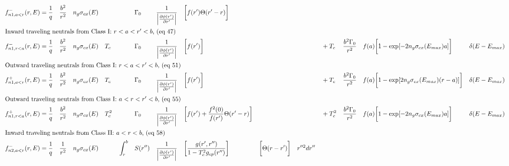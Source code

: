 \documentclass[a3]{book}
\begin{document}
{\begin{align}
&	f_{n1,a<r}^-(r, E) 	= \frac{1}{q}  	&& \frac{b^2}{ r^2 } 	&& n_g \sigma_{cx}(E) 	&&       		&& 			&& \Gamma_0 	&& \frac{1}{ \Big\vert \frac{  \partial \phi(r') }{ \partial r' } \Big\vert}	&& \bigg[ f(r') \Theta(r' - r) \bigg]   \\
	\intertext{Inward traveling neutrals from Class I: $r < a < r' < b$, (eq 47)} 																																																																														
&	f_{n1,r<a}^-(r, E)  	= \frac{1}{q} 	&& \frac{b^2}{ r^2 } 	&& n_g \sigma_{cx}(E) 	&& T_c 		&& 		 	&& \Gamma_0	&& \frac{1}{ \Big\vert \frac{  \partial \phi(r') }{ \partial r' } \Big\vert} 	&& \bigg[ f(r') \bigg] 											&& 																			&& 			&& + T_c	&& \frac{b^2 \Gamma_0}{r^2}   												&& f(a) \bigg[ 1 - \text{exp}[-2n_g\sigma_{cx}(E_{max})a] \bigg] 		&& \delta(E-E_{max})  		\\
%																																																																														
	\intertext{Outward traveling neutrals from Class I: $ r < a < r' < b$, (eq 51)}																																																																												
&	f_{n1,a<r}^+(r, E) 	= \frac{1}{q} 	&& \frac{b^2}{ r^2 }	&& n_g \sigma_{cx}(E) 	&& T_c 		&& 		 	&& \Gamma_0	&& \frac{1}{ \Big\vert \frac{  \partial \phi(r') }{ \partial r' } \Big\vert}	&& \bigg[ f(r')  \bigg]  											&& 																			&& 			&& + T_c	&& \frac{b^2 \Gamma_0}{r^2}  												&& f(a) \bigg[ 1 - \text{exp}[2 n_g\sigma_{cx}(E_{max})(r-a)] \bigg] 	&& \delta(E-E_{max})   	\\
	\intertext{Outward traveling neutrals from Class I: $a < r < r' < b$, (eq 55)}																																																																														
&	f_{n1,r<a}^+(r, E)  	= \frac{1}{q} 	&& \frac{b^2}{ r^2 }	&& n_g \sigma_{cx}(E) 	&& T_c^2 	&& 		 	&& \Gamma_0	&& \frac{1}{ \Big\vert \frac{  \partial \phi(r') }{ \partial r' } \Big\vert}	&& \bigg[ f(r') + \frac{f^2(0)}{f(r')} \Theta(r'-r) \bigg]  			&& 																			&& 			&& + T_c^2	&& \frac{b^2 \Gamma_0}{r^2}  												&& f(a) \bigg[ 1 - \text{exp}[-2n_g\sigma_{cx}(E_{max})a] \bigg] 		&& \delta(E-E_{max})   	\\
%																																																																														
	\intertext{Inward traveling neutrals from Class II: $ a < r < b$, (eq 58) }																																																																														
&	f_{n2,a<r}^-(r, E)  	= \frac{1}{q} 	&& \frac{1}{r^2}		&& n_g \sigma_{cx}(E) 	&& 			&& \int_r^b	&& S(r'') 		&& \frac{1}{ \Big\vert \frac{ \partial \phi(r')}{ \partial r' } \Big\vert } 	&& \bigg[ \frac{ g(r',r'')}{ 1 - T_c^2 g_{cp}(r'')} \bigg] 			&& \bigg[ \Theta(r-r')  \bigg]													&& r''^2 dr''	&& \\

\end{align}}
\end{document}
